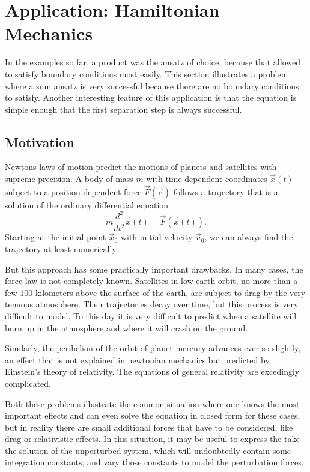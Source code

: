 %
%
%
\section{Application: Hamiltonian Mechanics\label{hamilton-mechanik}}
In the examples so far, a product was the ansatz of choice, because
that allowed to satisfy boundary conditions most easily.
This section illustrates a problem where a sum ansatz is very successful
because there are no boundary conditions to satisfy.
Another interesting feature of this application is that the
equation is simple enough that the first separation step is 
always successful.

\subsection{Motivation}
Newtons laws of motion predict the motions of planets and satellites
with supreme precision.
A body of mass $m$ with time dependent coordinates $\vec{x}(t)$
subject to a position dependent force $\vec{F}(\vec{c})$ follows a
trajectory that is a solution of the ordinary differential equation
\begin{equation}
m\frac{d^2}{dt^2}\vec x(t)=\vec F(\vec x(t)).
\label{jacobi:newton}
\end{equation}
Starting at the initial point $\vec{x}_0$ with initial velocity
$\vec{v}_0$, we can always find the trajectory at least numerically.

But this approach has some practically important drawbacks.
In many cases, the force law is not completely known.
Satellites in low earth orbit, no more than a few 100 kilometers above
the surface of the earth, are subject to drag by the very tenuous atmosphere.
Their trajectories decay over time, but this process is very difficult to model.
To this day it is very difficult to predict when a satellite will burn
up in the atmosphere and where it will crash on the ground.

Similarly, the perihelion of the orbit of planet mercury advances
ever so slightly, an effect that is not explained in newtonian mechanics
but predicted by Einstein's theory of relativity.
The equations of general relativity are excedingly complicated.

Both these problems illustrate the common situation where one knows
the most important effects and can even solve the equation in closed
form for these cases, but in reality there are small additional
forces that have to be considered, like drag or relativistic effects.
In this situation, it may be useful to express the take the solution
of the unperturbed system, which will undoubtedly contain some integration
constants, and vary those constants to model the perturbation forces.

